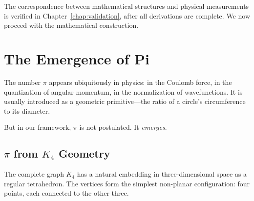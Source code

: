 \documentclass[11pt,a4paper]{book}
\begin{document}
The correspondence between mathematical structures and physical measurements is verified in Chapter~\ref{chap:validation}, after all derivations are complete. We now proceed with the mathematical construction.

\chapter{The Emergence of Pi}
\label{chap:pi}

The number $\pi$ appears ubiquitously in physics: in the Coulomb force, in the quantization 
of angular momentum, in the normalization of wavefunctions. It is usually introduced as a 
geometric primitive—the ratio of a circle's circumference to its diameter.

But in our framework, $\pi$ is not postulated. It \emph{emerges}.

\section{\texorpdfstring{$\pi$}{Pi} from $K_4$ Geometry}

The complete graph $K_4$ has a natural embedding in three-dimensional space as a regular 
tetrahedron. The vertices form the simplest non-planar configuration: four points, each 
connected to the other three.

\begin{center}
\end{center}
\end{document}
